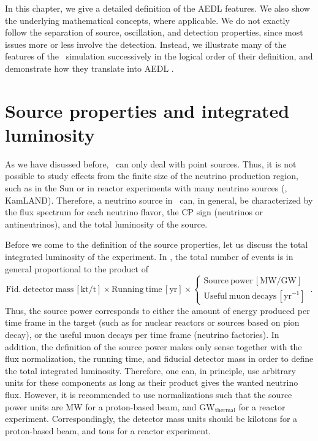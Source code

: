 In this chapter, we give a detailed definition of the AEDL features. We also show the underlying mathematical concepts, where applicable. We do not exactly follow the separation of source, oscillation, and detection properties, since most issues more or less involve the detection. Instead,
we illustrate many of the features of the \GLOBES\ simulation successively
in the logical order of their definition, and demonstrate how they translate into AEDL .

\section{Source properties and integrated luminosity}
\label{sec:source}

As we have disussed before, \GLOBES\ can only deal with point sources. Thus,  it is not possible to study effects from the finite size of the neutrino production region, such as in the Sun or in reactor experiments with many
neutrino sources (\eg, KamLAND). Therefore, a neutrino source in \GLOBES\ can, in general, be characterized by the flux spectrum for each neutrino flavor, the CP sign (neutrinos or antineutrinos), and the total luminosity
of the source.

Before we come to the definition of the source properties, let us discuss
the total integrated luminosity of the experiment. In \GLOBES , the total number of events is in general proportional to the product of
\begin{equation}
\mathrm{Fid.~detector~mass}\,\left[\mathrm{kt/t}\right]\times 
\mathrm{Running~time} \,\left[\mathrm{yr}\right]\times\left\{ \begin{array}{c}
\mathrm{Source~power}\,\left[\mathrm{MW/GW}\right]\\
\mathrm{Useful~muon~decays}\,\left[\mathrm{yr}^{-1}\right]
\end{array}\right.\,.
\end{equation}
Thus, the source power corresponds to either the amount of energy produced per time frame in the target (such as for nuclear reactors or sources based on pion decay), or the useful muon decays per time frame (neutrino factories). In addition, the definition of the source power makes only sense together with the flux normalization, the running time, and fiducial detector mass in order to define the total integrated luminosity. Therefore, one can, in principle, use arbitrary units for these components as long as their product gives the wanted neutrino flux. However, it is
recommended to use normalizations such that the source power units are $\mathrm{MW}$ for a proton-based beam, and $\mathrm{GW}_\mathrm{thermal}$ for a reactor experiment. Correspondingly, the detector mass units should be kilotons for a proton-based beam, and tons for a reactor experiment.

